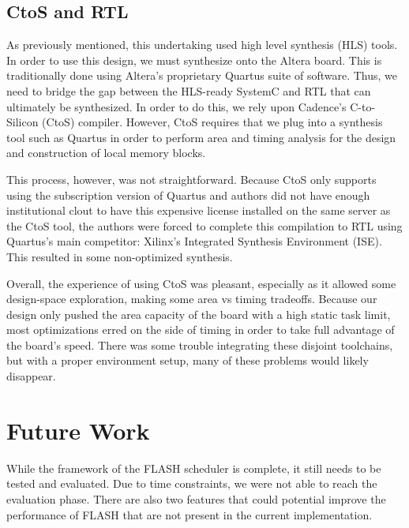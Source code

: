 \documentclass{sig-alternate-10pt}
\begin{document}
\subsection{CtoS and RTL}
As previously mentioned, this undertaking used high level synthesis (HLS)
tools.  In order to use this design, we must synthesize onto the Altera
board.  This is traditionally done using Altera's proprietary Quartus suite
of software.  Thus, we need to bridge the gap between the HLS-ready SystemC
and RTL that can ultimately be synthesized.  In order to do this, we rely
upon Cadence's C-to-Silicon (CtoS) compiler.  However, CtoS requires that we
plug into a synthesis tool such as Quartus in order to perform area and
timing analysis for the design and construction of local memory blocks.

This process, however, was not straightforward.  Because CtoS only supports
using the subscription version of Quartus and authors did not have enough
institutional clout to have this expensive license installed on the same
server as the CtoS tool, the authors were forced to complete this
compilation to RTL using Quartus's main competitor: Xilinx's Integrated
Synthesis Environment (ISE).  This resulted in some non-optimized synthesis.

Overall, the experience of using CtoS was pleasant, especially as it allowed
some design-space exploration, making some area vs timing tradeoffs.
Because our design only pushed the area capacity of the board with a high
static task limit, most optimizations erred on the side of timing in order
to take full advantage of the board's speed.  There was some trouble
integrating these disjoint toolchains, but with a proper environment setup,
many of these problems would likely disappear.


\section{Future Work}
\label{sec:future}
While the framework of the FLASH scheduler is complete, it still needs to be tested and evaluated. Due to time constraints, we were not able to reach the evaluation phase. There are also two features that could potential improve the performance of FLASH that are not present in the current implementation.
\end{document}
